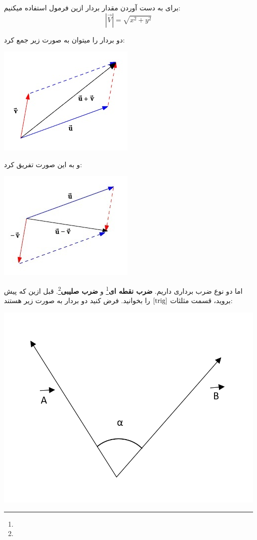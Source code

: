 \documentclass[14pt,a4paper]{memoir}
\begin{document}
برای به دست آوردن مقدار بردار ازین فرمول استفاده میکنیم:
\[ |\vec{V}| =  \sqrt{x^2 + y^2} \]
	
	
	
	 
	 دو بردار را میتوان به صورت زیر جمع کرد:
	 
	 
	 	 \begin{center}
	 	\includegraphics[scale=1]{VectorAdd}
	 \end{center}
 
 و به این صورت تفریق کرد:
  
 \begin{center}
 	\includegraphics[scale=1]{VectorSubtract}
 \end{center}
 
	 
	 
	 اما دو نوع ضرب برداری داریم. \textbf{ضرب نقطه ای}\footnote{} و \textbf{ضرب صلیبی}\footnote{}. قبل ازین که پیش بروید، قسمت مثلثات \(\ref{trig}\) را بخوانید. فرض کنید دو بردار به صورت زیر هستند:
	 
	 
	  \begin{center}
	 	\includegraphics[scale=0.3]{Product}
	 \end{center}
	 
\end{document}

